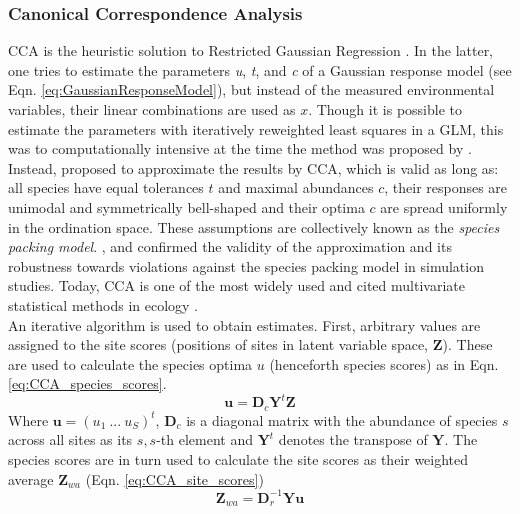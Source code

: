 \documentclass[a4paper,11pt]{article}
\begin{document}
	\subsubsection*{Canonical Correspondence Analysis}
	 CCA is the heuristic solution to Restricted Gaussian Regression \citep{Zuur2007}. 
	 In the latter, one tries to estimate the parameters \textit{u}, \textit{t}, and \textit{c} of a Gaussian response model (see Eqn. \ref{eq:GaussianResponseModel}), but instead of the measured environmental variables, their linear combinations are used as $x$. 
	 Though it is possible to estimate the parameters with iteratively reweighted least squares in a GLM, this was to computationally intensive at the time the method was proposed by  \citet{GauchJr1972}.
	 Instead, \citep{TerBraak1986} proposed to approximate the results by CCA, which is valid as long as: all species have equal tolerances $t$ and maximal abundances $c$, their responses are unimodal and symmetrically bell-shaped and their optima $c$ are spread uniformly in the ordination space. 
	 These assumptions are collectively known as the \textit{species packing model}.
	 \citet{Palmer1993}, \citet{Johnson1999} and \citet{Zuur1999} confirmed the validity of the approximation and its robustness towards violations against the species packing model in simulation studies.
	 Today, CCA is one of the most widely used and cited multivariate statistical methods in ecology \citep{Braak2014}.\\
		An iterative algorithm is used to obtain estimates. 
		First, arbitrary values are assigned to the site scores (positions of sites in latent variable space, $\mathbf{Z}$). 
		These are used to calculate the species optima $u$ (henceforth species scores) as in Eqn. \ref{eq:CCA_species_scores}.
		\begin{equation}\label{eq:CCA_species_scores}
		\mathbf{u} = \mathbf{D}_c \mathbf{Y}^t \mathbf {Z}
		\end{equation}
		Where $\mathbf{u} = (u_1\ ...\ u_S)^t$, $\mathbf{D}_c$ is a diagonal matrix with the abundance of species $s$ across all sites as its $s,s$-th element and $\mathbf{Y}^t$ denotes the transpose of $\mathbf{Y}$.
		The species scores are in turn used to calculate the site scores as their weighted average $\mathbf{Z}_{wa}$ (Eqn. \ref{eq:CCA_site_scores}) 
		\begin{equation} \label{eq:CCA_site_scores}
			\mathbf{Z}_{wa} = \mathbf{D}_r^{-1} \mathbf{Y} \mathbf {u}
		\end{equation}
\end{document}
